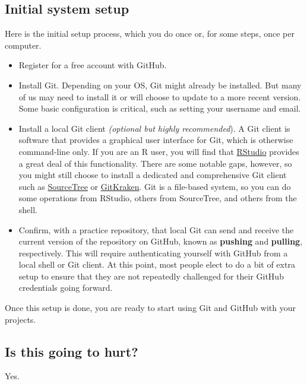 \documentclass[12pt]{article}
\begin{document}
\subsection{Initial system setup}\label{initial-system-setup}

Here is the initial setup process, which you do once or, for some steps,
once per computer.

\begin{itemize}
\item
  Register for a free account with GitHub.
\item
  Install Git. Depending on your OS, Git might already be installed. But
  many of us may need to install it or will choose to update to a more
  recent version. Some basic configuration is critical, such as setting
  your username and email.
\item
  Install a local Git client \emph{(optional but highly recommended}). A
  Git client is software that provides a graphical user interface for
  Git, which is otherwise command-line only. If you are an R user, you
  will find that
  \href{https://www.rstudio.com/products/rstudio-desktop/}{RStudio}
  provides a great deal of this functionality. There are some notable
  gaps, however, so you might still choose to install a dedicated and
  comprehensive Git client such as
  \href{https://www.sourcetreeapp.com}{SourceTree} or
  \href{https://www.gitkraken.com}{GitKraken}. Git is a file-based
  system, so you can do some operations from RStudio, others from
  SourceTree, and others from the shell.
\item
  Confirm, with a practice repository, that local Git can send and
  receive the current version of the repository on GitHub, known as
  \textbf{pushing} and \textbf{pulling}, respectively. This will require
  authenticating yourself with GitHub from a local shell or Git client.
  At this point, most people elect to do a bit of extra setup to ensure
  that they are not repeatedly challenged for their GitHub credentials
  going forward.
\end{itemize}

Once this setup is done, you are ready to start using Git and GitHub
with your projects.

\subsection{Is this going to hurt?}\label{is-this-going-to-hurt}

Yes.
\end{document}
